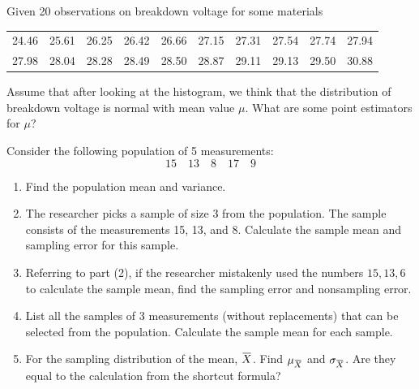 \begin{mdframed}
    \vspace{-0.25cm}
    \hspace{-0.25cm}
    \begin{Exercise}
        Given 20 observations on breakdown voltage for some materials
        \begin{center}
            \begin{tabular}{cccccccccc}
            24.46 & 25.61 & 26.25 & 26.42 & 26.66 & 27.15 & 27.31 & 27.54 & 27.74 & 27.94\\
            27.98 & 28.04 & 28.28 & 28.49 & 28.50 & 28.87 & 29.11 & 29.13 & 29.50 & 30.88\\
            \end{tabular}
        \end{center}

        Assume that after looking at the histogram, we think that 
the distribution of breakdown voltage is normal with 
mean value $\mu$.  What are some point estimators for $\mu$?
    \end{Exercise}

    \vspace{0.752cm}
    \begin{Exercise}
    Consider the following population of 5 measurements:
    \[
        15\quad 13\quad 8\quad 17\quad 9
    \]
    \begin{enumerate}
        \item Find the population mean and variance.
        \item The researcher picks a sample of size 3 from the population. The sample 
        consists of the measurements 15, 13, and 8. Calculate the sample mean and sampling error 
        for this sample.
        \item Referring to part (2), if the researcher mistakenly used the numbers $15, 13, 6$ to calculate
        the sample mean, find the sampling error and nonsampling error.
        \item List all the samples of 3 measurements (without replacements) that can be selected from the population. 
        Calculate the sample mean for each sample.
        \item For the sampling distribution of the mean, $\ols{X}$. Find $\mu_{\ols{X}}$ and $\sigma_{\ols{X}}$. 
        Are they equal to the calculation from the shortcut formula?
    \end{enumerate}
    \end{Exercise}


\end{mdframed}
